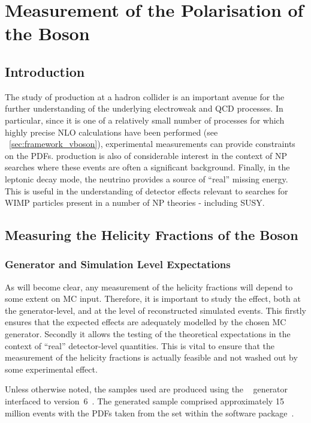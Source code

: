 \chapter{Measurement of the Polarisation of the \texorpdfstring{\PW}{W} Boson}
\label{sec:wpol}
\section{Introduction}
The study of \Wjets production at a hadron collider is an important avenue for
the further understanding of the underlying electroweak and \ac{QCD} processes. In
particular, since it is one of a relatively small number of processes for which
highly precise \ac{NLO} calculations have been performed (see
\sec~\ref{sec:framework_vboson}), experimental measurements can provide
constraints on the \acp{PDF}. \Wjets production is also of considerable interest
in the context of \ac{NP} searches where these events are often a significant
background. Finally, in the leptonic decay mode, the neutrino provides a source
of ``real'' missing energy. This is useful in the understanding of detector
effects relevant to searches for \acs{WIMP} particles present in a number of
\ac{NP} theories - including \ac{SUSY}.

\section{Measuring the Helicity Fractions of the \texorpdfstring{\PW}{W} Boson}
\subsection{Generator and Simulation Level Expectations}
As will become clear, any measurement of the helicity fractions will depend to
some extent on \acl{MC} input. Therefore, it is important to study the effect,
both at the generator-level, and at the level of reconstructed simulated
events. This firstly ensures that the expected effects are adequately modelled
by the chosen \ac{MC} generator. Secondly it allows the testing of the
theoretical expectations in the context of ``real'' detector-level
quantities. This is vital to ensure that the measurement of the helicity
fractions is actually feasible and not washed out by some experimental effect.

Unless otherwise noted, the \Wjets samples used are produced using the
\madgraph~\cite{madgraph} generator interfaced to \pythia
version~6~\cite{pythia}. The generated sample comprised approximately 15 million
events with the \acp{PDF} taken from the \cteqsixlone set within the \lhapdf
software package~\cite{lhapdf,lhapdf_web}.

